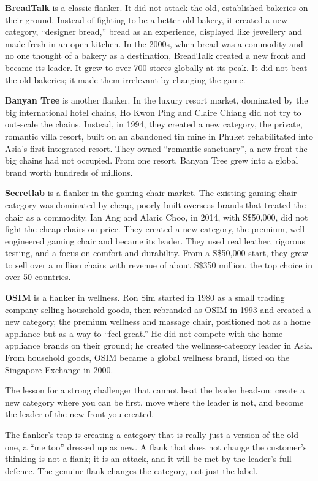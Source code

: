 \documentclass[10pt,twoside,openany]{memoir}
\begin{document}
{\textbf{BreadTalk} is a classic flanker. It did not attack the old,
established bakeries on their ground. Instead of fighting to be a better
old bakery, it created a new category, ``designer bread,'' bread as an
experience, displayed like jewellery and made fresh in an open kitchen.
In the 2000s, when bread was a commodity and no one thought of a bakery
as a destination, BreadTalk created a new front and became its leader.
It grew to over 700 stores globally at its peak. It did not beat the old
bakeries; it made them irrelevant by changing the game.

\textbf{Banyan Tree} is another flanker. In the luxury resort market,
dominated by the big international hotel chains, Ho Kwon Ping and Claire
Chiang did not try to out-scale the chains. Instead, in 1994, they
created a new category, the private, romantic villa resort, built on an
abandoned tin mine in Phuket rehabilitated into Asia's first integrated
resort. They owned ``romantic sanctuary'', a new front the big chains
had not occupied. From one resort, Banyan Tree grew into a global brand
worth hundreds of millions.

\textbf{Secretlab} is a flanker in the gaming-chair market. The existing
gaming-chair category was dominated by cheap, poorly-built overseas
brands that treated the chair as a commodity. Ian Ang and Alaric Choo,
in 2014, with S\$50,000, did not fight the cheap chairs on price. They
created a new category, the premium, well-engineered gaming chair and
became its leader. They used real leather, rigorous testing, and a focus
on comfort and durability. From a S\$50,000 start, they grew to sell
over a million chairs with revenue of about S\$350 million, the top
choice in over 50 countries.

\textbf{OSIM} is a flanker in wellness. Ron Sim started in 1980 as a
small trading company selling household goods, then rebranded as OSIM in
1993 and created a new category, the premium wellness and massage chair,
positioned not as a home appliance but as a way to ``feel great.'' He
did not compete with the home-appliance brands on their ground; he
created the wellness-category leader in Asia. From household goods, OSIM
became a global wellness brand, listed on the Singapore Exchange in
2000.

The lesson for a strong challenger that cannot beat the leader head-on:
create a new category where you can be first, move where the leader is
not, and become the leader of the new front you created.

The flanker's trap is creating a category that is really just a version
of the old one, a ``me too'' dressed up as new. A flank that does not
change the customer's thinking is not a flank; it is an attack, and it
will be met by the leader's full defence. The genuine flank changes the
category, not just the label.

}
\end{document}
